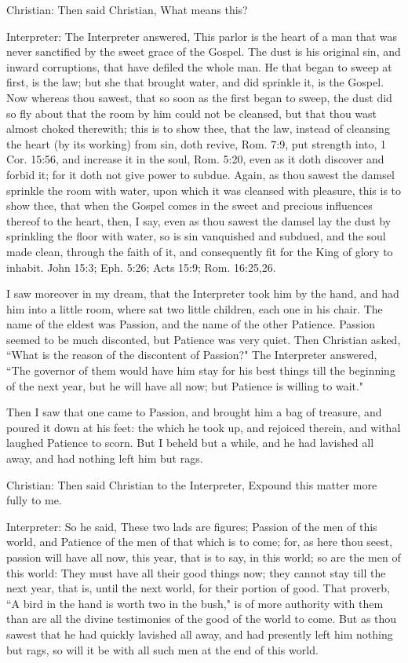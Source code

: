 Christian: Then said Christian, What means this?

Interpreter: The Interpreter answered, This parlor is the heart of a man that was never sanctified by the sweet grace of the Gospel. The dust is his original sin, and inward corruptions, that have defiled the whole man. He that began to sweep at first, is the law; but she that brought water, and did sprinkle it, is the Gospel. Now whereas thou sawest, that so soon as the first began to sweep, the dust did so fly about that the room by him could not be cleansed, but that thou wast almost choked therewith; this is to show thee, that the law, instead of cleansing the heart (by its working) from sin, doth revive, Rom. 7:9, put strength into, 1 Cor. 15:56, and increase it in the soul, Rom. 5:20, even as it doth discover and forbid it; for it doth not give power to subdue. Again, as thou sawest the damsel sprinkle the room with water, upon which it was cleansed with pleasure, this is to show thee, that when the Gospel comes in the sweet and precious influences thereof to the heart, then, I say, even as thou sawest the damsel lay the dust by sprinkling the floor with water, so is sin vanquished and subdued, and the soul made clean, through the faith of it, and consequently fit for the King of glory to inhabit. John 15:3; Eph. 5:26; Acts 15:9; Rom. 16:25,26.

I saw moreover in my dream, that the Interpreter took him by the hand, and had him into a little room, where sat two little children, each one in his chair. The name of the eldest was Passion, and the name of the other Patience. Passion seemed to be much disconted, but Patience was very quiet. Then Christian asked, ``What is the reason of the discontent of Passion?" The Interpreter answered, ``The governor of them would have him stay for his best things till the beginning of the next year, but he will have all now; but Patience is willing to wait."

Then I saw that one came to Passion, and brought him a bag of treasure, and poured it down at his feet: the which he took up, and rejoiced therein, and withal laughed Patience to scorn. But I beheld but a while, and he had lavished all away, and had nothing left him but rags.

Christian: Then said Christian to the Interpreter, Expound this matter more fully to me.

Interpreter: So he said, These two lads are figures; Passion of the men of this world, and Patience of the men of that which is to come; for, as here thou seest, passion will have all now, this year, that is to say, in this world; so are the men of this world: They must have all their good things now; they cannot stay till the next year, that is, until the next world, for their portion of good. That proverb, ``A bird in the hand is worth two in the bush," is of more authority with them than are all the divine testimonies of the good of the world to come. But as thou sawest that he had quickly lavished all away, and had presently left him nothing but rags, so will it be with all such men at the end of this world.

